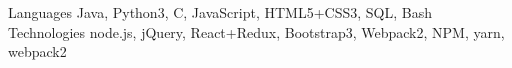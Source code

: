 
\begin{cvskills}
\cvskill
    {Languages}
    {Java, Python3, C, JavaScript, HTML5+CSS3, SQL, Bash}
\cvskill
    {Technologies}
    {node.js, jQuery, React+Redux, Bootstrap3, Webpack2, NPM, yarn, webpack2}
\end{cvskills}